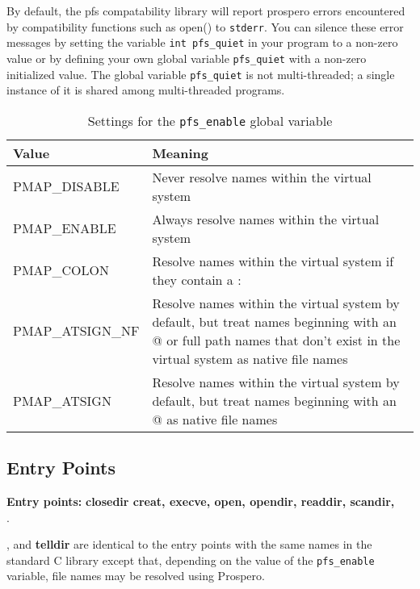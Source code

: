 By default, the pfs compatability library will report prospero errors
encountered by compatibility functions such as open() to {\tt stderr}.
You can silence these error messages by setting the variable {\tt int
pfs\_quiet} in your program to a non-zero value or by defining your
own global variable {\tt pfs\_quiet} with a non-zero initialized
value.  The global variable {\tt pfs\_quiet} is not multi-threaded; a
single instance of it is shared among multi-threaded programs.

\begin{table}
\begin{center}
\caption{Settings for the {\tt pfs\_enable} global variable\label{pfsenable}}
\vspace{0.1in}
\begin{tabular}{|l|p{3.9in}|} \hline
Value & Meaning \\ \hline \hline
PMAP\_DISABLE & Never resolve names within the virtual system \\ \hline 
PMAP\_ENABLE & Always resolve names within the virtual system \\ \hline 
PMAP\_COLON & Resolve names within the virtual system if they contain a : \\ \hline 
PMAP\_ATSIGN\_NF & Resolve names within the virtual system by default, but
treat names beginning with an @ or full path names that
don't exist in the virtual system as native file names \\ \hline 
PMAP\_ATSIGN & Resolve names within the virtual system by default, but 
treat names beginning with an @ as native file names \\ \hline
\end{tabular}
\vspace{-0.1in}
\end{center}
\end{table}

\subsection{Entry Points}

\begin{tabbing}
{\Large \bf Entry points:} \= {\bf closedir creat, execve,
open, opendir, readdir, scandir,}\\
.
\end{tabbing}

, and {\bf telldir} are identical to the entry points
with the same names in the standard C library except that, depending
on the value of the {\tt pfs\_enable} variable, file names may be resolved
using Prospero.


